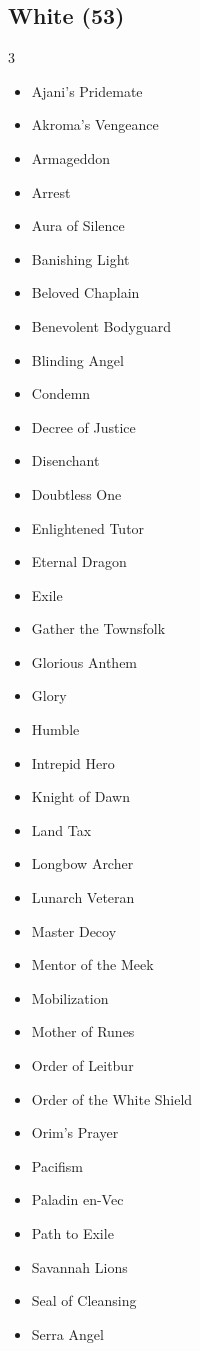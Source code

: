 \documentclass[11pt]{article}
\begin{document}
\subsection*{White (53)}
\begin{multicols}{3}
\footnotesize
\begin{itemize}[leftmargin=1em,itemsep=0pt,parsep=0pt]
\item Ajani's Pridemate
\item Akroma's Vengeance
\item Armageddon
\item Arrest
\item Aura of Silence
\item Banishing Light
\item Beloved Chaplain
\item Benevolent Bodyguard
\item Blinding Angel
\item Condemn
\item Decree of Justice
\item Disenchant
\item Doubtless One
\item Enlightened Tutor
\item Eternal Dragon
\item Exile
\item Gather the Townsfolk
\item Glorious Anthem
\item Glory
\item Humble
\item Intrepid Hero
\item Knight of Dawn
\item Land Tax
\item Longbow Archer
\item Lunarch Veteran
\item Master Decoy
\item Mentor of the Meek
\item Mobilization
\item Mother of Runes
\item Order of Leitbur
\item Order of the White Shield
\item Orim's Prayer
\item Pacifism
\item Paladin en-Vec
\item Path to Exile
\item Savannah Lions
\item Seal of Cleansing
\item Serra Angel

\end{itemize}
\end{multicols}
\end{document}
